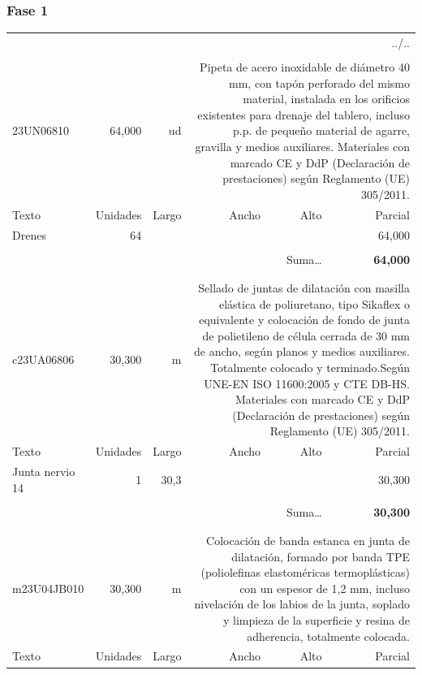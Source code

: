 \documentclass{book}%
\begin{document}
\subsubsection{Fase 1}%
\begin{longtable}{lrrrrr}%
\multicolumn{6}{r}{../..}\\%
\endfoot%
\endlastfoot%
&&&&&\\%
23UN06810&    64,000& ud&\multicolumn{3}{p{6cm}}{\scriptsize Pipeta de acero inoxidable de diámetro 40 mm, con tapón perforado del mismo material, instalada en los orificios existentes para drenaje del tablero, incluso p.p. de pequeño material de agarre, gravilla y medios auxiliares. Materiales con marcado CE y DdP (Declaración de prestaciones) según Reglamento (UE) 305/2011.\normalsize}\\%
Texto&Unidades&Largo&Ancho&Alto&Parcial\\%
\hline%
\multicolumn{1}{p{3.5cm}}{Drenes}&64&&&&    64,000\\%
&&&&&\\%
\multicolumn{5}{r}{Suma\ldots}&\textbf{    64,000}\\%
\hline%
&&&&&\\%
&&&&&\\%
c23UA06806&    30,300& m&\multicolumn{3}{p{6cm}}{\scriptsize Sellado de juntas de dilatación con masilla elástica de poliuretano, tipo Sikaflex o equivalente y colocación de fondo de junta de polietileno de célula cerrada de 30 mm de ancho, según planos y medios auxiliares. Totalmente colocado y terminado.Según UNE-EN ISO 11600:2005 y CTE DB-HS. Materiales con marcado CE y DdP (Declaración de prestaciones) según Reglamento (UE) 305/2011.\normalsize}\\%
Texto&Unidades&Largo&Ancho&Alto&Parcial\\%
\hline%
\multicolumn{1}{p{3.5cm}}{Junta nervio 14}&1&30,3&&&    30,300\\%
&&&&&\\%
\multicolumn{5}{r}{Suma\ldots}&\textbf{    30,300}\\%
\hline%
&&&&&\\%
&&&&&\\%
m23U04JB010&    30,300& m&\multicolumn{3}{p{6cm}}{\scriptsize Colocación de banda estanca en junta de dilatación, formado por banda TPE (poliolefinas elastoméricas termoplásticas) con un espesor de 1,2 mm, incluso nivelación de los labios de la junta, soplado y limpieza de la superficie y resina de adherencia, totalmente colocada.\normalsize}\\%
Texto&Unidades&Largo&Ancho&Alto&Parcial\\%

\end{longtable}
\end{document}
